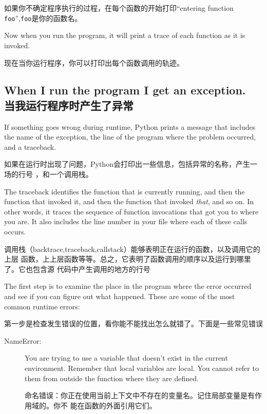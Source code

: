 \documentclass[10pt]{book}
\begin{document}
\begin{CJK}{UTF8}{gbsn}
如果你不确定程序执行的过程，在每个函数的开始打印``entering function {\tt
foo}'',{\tt foo}是你的函数名。

Now when you run the program, it will print a trace of each
function as it is invoked.

现在当你运行程序，你可以打印出每个函数调用的轨迹。

\subsection{When I run the program I get an exception.\\当我运行程序时产生了异常}

If something goes wrong during runtime, Python
prints a message that includes the name of the
exception, the line of the program where the problem occurred,
and a traceback.

如果在运行时出现了问题，Python会打印出一些信息，包括异常的名称，产生一场的行号
，和一个调用栈。

The traceback identifies the function that is currently running,
and then the function that invoked it, and then the function that
invoked {\em that}, and so on.  In other words, it traces the
sequence of function invocations that got you to where you are.  It
also includes the line number in your file where each of these
calls occurs.

调用栈（backtrace,traceback,callstack）能够表明正在运行的函数，以及调用它的上层
函数，上上层函数等等。总之，它表明了函数调用的顺序以及运行到哪里了。它也包含源
代码中产生调用的地方的行号

The first step is to examine the place in the program where
the error occurred and see if you can figure out what happened.
These are some of the most common runtime errors:

第一步是检查发生错误的位置，看你能不能找出怎么就错了。下面是一些常见错误

\begin{description}

\item[NameError:]  You are trying to use a variable that doesn't
exist in the current environment.
Remember that local variables are local.  You
cannot refer to them from outside the function where they are defined.

命名错误：你正在使用当前上下文中不存在的变量名。记住局部变量是有作用域的。你不
能在函数的外面引用它们。


\end{description}
\end{CJK}
\end{document}
